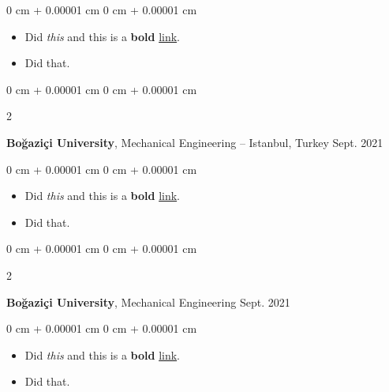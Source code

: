 \documentclass[10pt, letterpaper]{article}
\newenvironment{highlights}{
    \begin{itemize}[
        topsep=0.10 cm,
        parsep=0.10 cm,
        partopsep=0pt,
        itemsep=0pt,
        leftmargin=0 cm + 10pt
    ]
}{
    \end{itemize}
        
    \vspace{-0.10cm}
} %
\newenvironment{onecolentry}{
    \begin{adjustwidth}{
        0 cm + 0.00001 cm
    }{
        0 cm + 0.00001 cm
    }
}{
    \end{adjustwidth}
} %
\newenvironment{twocolentry}[2][]{
    \onecolentry
    \def\secondColumn{#2}
    \setcolumnwidth{\fill, 4.1 cm}
    \begin{paracol}{2}
}{
    \switchcolumn \raggedleft \secondColumn
    \end{paracol}
    \endonecolentry
} %
\begin{document}
        \vspace{0.10 cm}
        \begin{onecolentry}
            \begin{highlights}
                \item Did \textit{this} and this is a \textbf{bold} \href{https://example.com}{link}.
                \item Did that.
            \end{highlights}
        \end{onecolentry}


        \vspace{0.15 cm}

        \begin{twocolentry}{
            Sept. 2021
        }
            \textbf{Boğaziçi University}, Mechanical Engineering -- Istanbul, Turkey\end{twocolentry}

        \vspace{0.10 cm}
        \begin{onecolentry}
            \begin{highlights}
                \item Did \textit{this} and this is a \textbf{bold} \href{https://example.com}{link}.
                \item Did that.
            \end{highlights}
        \end{onecolentry}


        \vspace{0.15 cm}

        \begin{twocolentry}{
            Sept. 2021
        }
            \textbf{Boğaziçi University}, Mechanical Engineering\end{twocolentry}

        \vspace{0.10 cm}
        \begin{onecolentry}
            \begin{highlights}
                \item Did \textit{this} and this is a \textbf{bold} \href{https://example.com}{link}.
                \item Did that.
            \end{highlights}
        \end{onecolentry}


        \vspace{0.15 cm}
\end{document}
